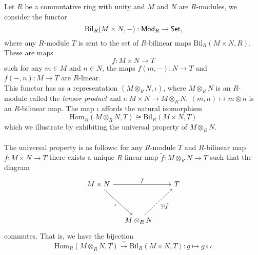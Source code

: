 \begin{example}\label{tensorprodrep}
Let $R$ be a commutative ring with unity and $M$ and $N$ are $R$-modules, we consider the functor
\[\mathrm{Bil}_R(M \times N,-):\mathsf{Mod}_R \to \mathsf{Set},\]
where any $R$-module $T$ is sent to the set of $R$-bilinear maps $\mathrm{Bil}_R(M \times N,R)$. These are maps \[f: M\times N \to T\] such for any $m \in M$ and $n\in N$, the maps $f(m,-):N \to T$ and $f(-,n):M \to T$ are $R$-linear.\\[0.5em]
This functor has as a representation $(M\otimes_R N,\iota)$, where $M \otimes_R N$ is an $R$-module called the \emph{tensor product} and $\iota: M \times N \to M\otimes_R N,\ (m,n) \mapsto m\otimes n$ is an $R$-bilinear map. The map $\iota$ affords the natural isomorphism
\[\mathrm{Hom}_R(M \otimes_R N,T) \cong \mathrm{Bil}_R(M \times N,T)\]
which we illustrate by exhibiting the universal property of $M \otimes_R N$.\\
\\
The universal property is as follows: for any $R$-module $T$ and $R$-bilinear map $f:M \times N \to T$ there exists a unique $R$-linear map $\tilde{f}:M \otimes_R N \to T$ such that the diagram
\[\begin{tikzcd}[row sep=huge, column sep=small]
M \times N \arrow[rr, "f"]\arrow[rd, "\iota"']         & &[1em] T \\
 & M \otimes_R N \arrow[ur, "\exists!\tilde{f}"', dashed] &
\end{tikzcd}\]
commutes. That is, we have the bijection
\[\mathrm{Hom}_R(M \otimes_R N,T) \overset{\sim}{\longrightarrow} \mathrm{Bil}_R(M \times N,T):g \mapsto g\circ\iota\]
\end{example}


